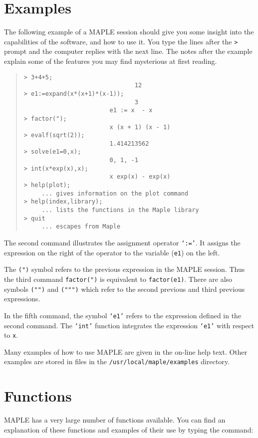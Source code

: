 \documentclass[twoside,11pt]{article}
\newcommand{\xlabel}[1]{}
\begin{document}
\section{Examples\xlabel{examples}}

The following example of a MAPLE session should give you some insight
into the capabilities of the software, and how to use it.  You type the
lines after the \verb+>+ prompt and the computer replies with the next line.
The notes after the example explain some of the features you may find
mysterious at first reading.

\begin{quote}\begin{verbatim}
> 3+4+5;
                               12
> e1:=expand(x*(x+1)*(x-1));
                               3
                        e1 := x  - x
> factor(");
                        x (x + 1) (x - 1)
> evalf(sqrt(2));
                        1.414213562
> solve(e1=0,x);
                        0, 1, -1
> int(x*exp(x),x);
                        x exp(x) - exp(x)
> help(plot);
     ... gives information on the plot command
> help(index,library);
     ... lists the functions in the Maple library
> quit
     ... escapes from Maple
\end{verbatim}\end{quote}

The second command illustrates the assignment operator \texttt{`:='}. It
assigns the expression on the right of the operator to the variable 
(\texttt{e1}) on the left.

The \texttt{(")} symbol refers to the previous expression in the MAPLE
session. Thus the third command \texttt{factor(")} is equivalent to
\texttt{factor(e1)}. There are also symbols \texttt{("")} and \texttt{(""")}
which refer to the second previous and third previous expressions.

In the fifth command, the symbol \texttt{`e1'} refers to the expression
defined in the second command. The \texttt{`int'} function integrates the
expression \texttt{`e1'} with respect to \texttt{x}.

Many examples of how to use MAPLE are given in the on-line help text.
Other examples are stored in files in the \texttt{/usr/local/maple/examples} 
directory.

\section{Functions\xlabel{functions}}

MAPLE has a very large number of functions available. You can find an
explanation of these functions and examples of their use by typing the
command:
\end{document}
